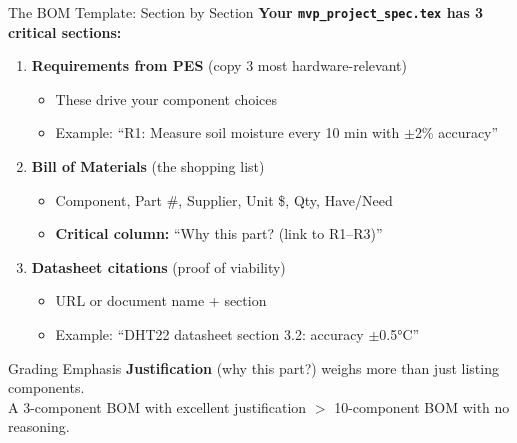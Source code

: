 \documentclass[aspectratio=169,11pt]{beamer}
\begin{document}
\begin{frame}{The BOM Template: Section by Section}
    \textbf{Your \texttt{mvp\_project\_spec.tex} has 3 critical sections:}
    
    \vspace{0.3cm}
    \begin{enumerate}
        \item \textbf{Requirements from PES} (copy 3 most hardware-relevant)
        \begin{itemize}
            \item These drive your component choices
            \item Example: ``R1: Measure soil moisture every 10 min with $\pm$2\% accuracy''
        \end{itemize}
        
        \vspace{0.2cm}
        \item \textbf{Bill of Materials} (the shopping list)
        \begin{itemize}
            \item Component, Part \#, Supplier, Unit \$, Qty, Have/Need
            \item \textbf{Critical column:} ``Why this part? (link to R1--R3)''
        \end{itemize}
        
        \vspace{0.2cm}
        \item \textbf{Datasheet citations} (proof of viability)
        \begin{itemize}
            \item URL or document name + section
            \item Example: ``DHT22 datasheet section 3.2: accuracy $\pm$0.5°C''
        \end{itemize}
    \end{enumerate}
    
    \vspace{0.2cm}
    \begin{block}{Grading Emphasis}
        \textbf{Justification} (why this part?) weighs more than just listing components.\\
        A 3-component BOM with excellent justification $>$ 10-component BOM with no reasoning.
    \end{block}
\end{frame}
\end{document}
